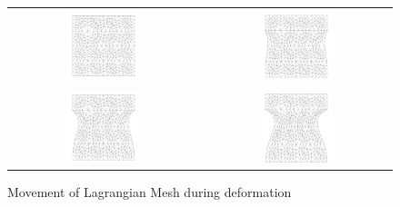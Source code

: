 \begin{figure}[htb]
\centering
\begin{tabular}{cc}
	\includegraphics[width=0.4\textwidth]{Figures/lagrangian_mesh_movement_001.png}
 &  \includegraphics[width=0.4\textwidth]{Figures/lagrangian_mesh_movement_002.png} 
 \\

	\includegraphics[width=0.4\textwidth]{Figures/lagrangian_mesh_movement_003.png} 
 &  \includegraphics[width=0.4\textwidth]{Figures/lagrangian_mesh_movement_004.png}  
 \\

\end{tabular}
\caption[bla]%
{Movement of Lagrangian Mesh  during deformation \protect\footnotemark}
\label{fig:LagMesh}
\end{figure}


